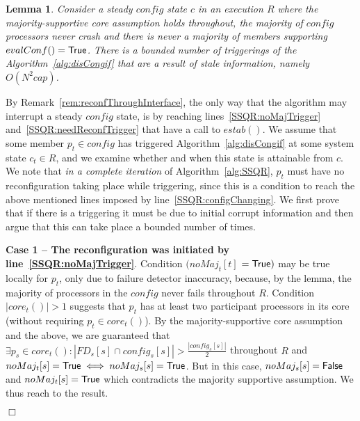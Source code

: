 \documentclass[11pt]{article}
\newcommand{\assert}{lemma}
\newcommand{\configEstab}{estab}
\newtheorem{lemma}[theorem]{Lemma}
\newenvironment{proof}{\noindent{\bf Proof.}}{\hfill$\Box$}
\begin{document}
\begin{lemma}
\label{thQ:noAbruptConfigTriggered}
Consider a steady $config$ state $c$ in an execution $R$ where the majority-supportive core assumption holds throughout, the majority of $config$ processors never crash and there is never a majority of members supporting $evalConf() = \sf True$. 
There is a bounded number of triggerings of the Algorithm~\ref{alg:disCongif} that are a result of stale information, namely  $O(N^2 cap)$.
\end{lemma}

\begin{proof}
By Remark~\ref{rem:reconfThroughInterface}, the only way that the algorithm may interrupt a steady $config$ state, is by reaching lines~\ref{SSQR:noMajTrigger} and~\ref{SSQR:needReconfTrigger} that have a call to $\configEstab()$.
We assume that some member $p_t \in config$ has triggered Algorithm~\ref{alg:disCongif} at some system state $c_t \in R$, and we examine whether and when this state is attainable from $c$.
We note that \emph{in a complete iteration} of Algorithm~\ref{alg:SSQR}, $p_t$ must have no reconfiguration taking place while triggering, since this is a condition to reach the above mentioned lines imposed by line~\ref{SSQR:configChanging}.
We first prove that if there is a triggering it must be due to initial corrupt information and then argue that this can take place a bounded number of times.


\noindent \textbf{Case 1 -- The reconfiguration was initiated by line~\ref{SSQR:noMajTrigger}}. 
Condition $(noMaj_t[t]$ $=\sf True)$ may be true locally for $p_t$, only due to failure detector inaccuracy, because, by the \assert, the majority of processors in the $config$ never fails throughout $R$. 
Condition $|core_t()|>1$ suggests that $p_t$ has at least two participant processors in its core (without requiring $p_t \in core_t()$). 
By the majority-supportive core assumption and the above, we are guaranteed that $\exists p_s \in core_t(): |FD_s[s] \cap config_s[s]| > \frac{|config_s[s]|}{2}$ throughout $R$ and $noMaj_t[s] = {\sf True} \iff noMaj_s[s] = {\sf True}$.
But in this case, $noMaj_s[s] = \sf False$ and $noMaj_t[s] = \sf True$ which contradicts the majority supportive assumption. 
We thus reach to the result.



\end{proof}
\end{document}
